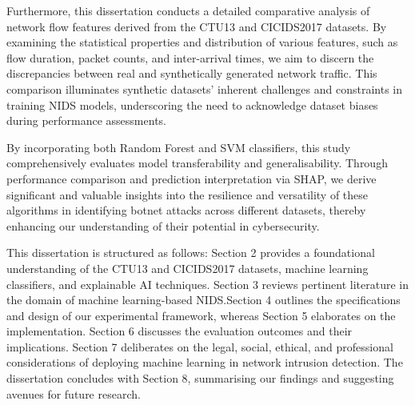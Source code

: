 Furthermore, this dissertation conducts a detailed comparative analysis of network flow features derived from the CTU13 and CICIDS2017 datasets. By examining the statistical properties and distribution of various features, such as flow duration, packet counts, and inter-arrival times, we aim to discern the discrepancies between real and synthetically generated network traffic. This comparison illuminates synthetic datasets’ inherent challenges and constraints in training NIDS models, underscoring the need to acknowledge dataset biases during performance assessments.

By incorporating both Random Forest and SVM classifiers, this study comprehensively evaluates model transferability and generalisability. Through performance comparison and prediction interpretation via SHAP, we derive significant and valuable insights into the resilience and versatility of these algorithms in identifying botnet attacks across different datasets, thereby enhancing our understanding of their potential in cybersecurity.

This dissertation is structured as follows: Section 2 provides a foundational understanding of the CTU13 and CICIDS2017 datasets, machine learning classifiers, and explainable AI techniques. Section 3 reviews pertinent literature in the domain of machine learning-based NIDS.\@ Section 4 outlines the specifications and design of our experimental framework, whereas Section 5 elaborates on the implementation. Section 6 discusses the evaluation outcomes and their implications. Section 7 deliberates on the legal, social, ethical, and professional considerations of deploying machine learning in network intrusion detection. The dissertation concludes with Section 8, summarising our findings and suggesting avenues for future research.